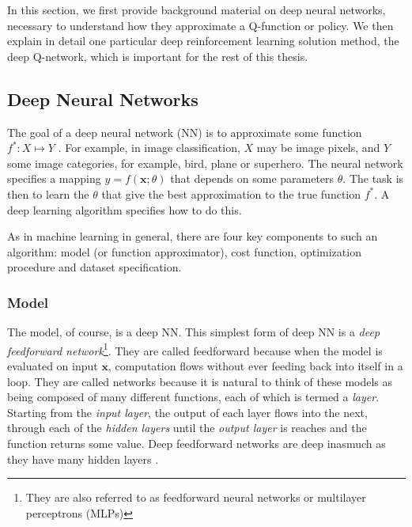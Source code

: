 \documentclass[11pt, a4paper, bibliography=totoc]{report}
\newcommand{\x}{\mathbf{x}}
\begin{document}
In this section, we first provide background material on deep neural networks, necessary to understand how they approximate a Q-function or policy. We then explain in detail one particular deep reinforcement learning solution method, the deep Q-network, which is important for the rest of this thesis.

\subsection{Deep Neural Networks}
The goal of a deep neural network (NN) is to approximate some function $ f^* : X \mapsto Y $ \cite{Goodfellow-et-al-2016}. For example, in image classification, $ X $ may be image pixels, and $ Y $ some image categories, for example, bird, plane or superhero. The neural network specifies a mapping $ y = f(\x ; \theta) $ that depends on some parameters $ \theta $. The task is then to learn the $ \theta $ that give the best approximation to the true function $ f^* $. A deep learning algorithm specifies how to do this.

As in machine learning in general, there are four key components to such an algorithm: model (or function approximator), cost function, optimization procedure and dataset specification.

\subsubsection{Model}
The model, of course, is a deep NN. This simplest form of deep NN is a \textit{deep feedforward network}\footnote{They are also referred to as feedforward neural networks or multilayer perceptrons (MLPs)}. They are called feedforward because when the model is evaluated on input $ \x $, computation flows without ever feeding back into itself in a loop. They are called networks because it is natural to think of these models as being composed of many different functions, each of which is termed a \textit{layer}. Starting from the \textit{input layer}, the output of each layer flows into the next, through each of the \textit{hidden layers} until the \textit{output layer} is reaches and the function returns some value. Deep feedforward networks are deep inasmuch as they have many hidden layers \cite[p.~164]{Goodfellow-et-al-2016}.
\end{document}
